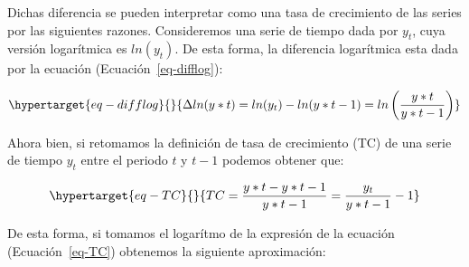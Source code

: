 \documentclass[
  a4paper,
]{article}
\begin{document}
\begin{figure}
\begin{minipage}[t]{\linewidth}
{{}

}

\end{minipage}%
\newline
\begin{minipage}[t]{\linewidth}

{\centering 


}

\end{minipage}%

\end{figure}

Dichas diferencia se pueden interpretar como una tasa de crecimiento de
las series por las siguientes razones. Consideremos una serie de tiempo
dada por \(y_t\), cuya versión logarítmica es \(ln(y_t)\). De esta
forma, la diferencia logarítmica esta dada por la ecuación
(Ecuación~\ref{eq-difflog}):

\begin{equation}\protect\hypertarget{eq-difflog}{}{
\Delta ln(y*t) = ln(y_t) - ln(y*{t-1}) = ln \left( \frac{y*t}{y*{t-1}} \right)
}\label{eq-difflog}\end{equation}

Ahora bien, si retomamos la definición de tasa de crecimiento (TC) de
una serie de tiempo \(y_t\) entre el periodo \(t\) y \(t-1\) podemos
obtener que:

\begin{equation}\protect\hypertarget{eq-TC}{}{
TC = \frac{y*t - y*{t-1}}{y*{t-1}} = \frac{y_t}{y*{t-1}} - 1
}\label{eq-TC}\end{equation}

De esta forma, si tomamos el logarítmo de la expresión de la ecuación
(Ecuación~\ref{eq-TC}) obtenemos la siguiente aproximación:
\end{document}
